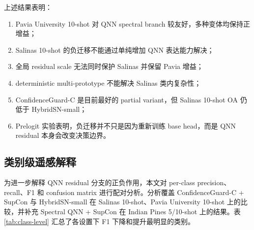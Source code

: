 \documentclass[UTF8,a4paper,zihao=-4,fontset=fandol]{ctexart}
\begin{document}
上述结果表明：

\begin{enumerate}[label=(\arabic*)]
  \item Pavia University 10-shot 对 QNN spectral branch 较友好，多种变体均保持正增益；
  \item Salinas 10-shot 的负迁移不能通过单纯增加 QNN 表达能力解决；
  \item 全局 residual scale 无法同时保护 Salinas 并保留 Pavia 增益；
  \item deterministic multi-prototype 不能解决 Salinas 类内复杂性；
  \item ConfidenceGuard-C 是目前最好的 partial variant，但 Salinas 10-shot OA 仍低于 HybridSN-small；
  \item Prelogit 实验表明，负迁移并不只是因为重新训练 base head，而是 QNN residual 本身会改变决策边界。
\end{enumerate}

\subsection{类别级遥感解释}

为进一步解释 QNN residual 分支的正负作用，本文对 per-class precision、recall、F1 和 confusion matrix 进行配对分析。分析覆盖 ConfidenceGuard-C + SupCon 与 HybridSN-small 在 Salinas 10-shot、Pavia University 10-shot 上的比较，并补充 Spectral QNN + SupCon 在 Indian Pines 5/10-shot 上的结果。表 \ref{tab:class-level} 汇总了各设置下 F1 下降和提升最明显的类别。
\end{document}
